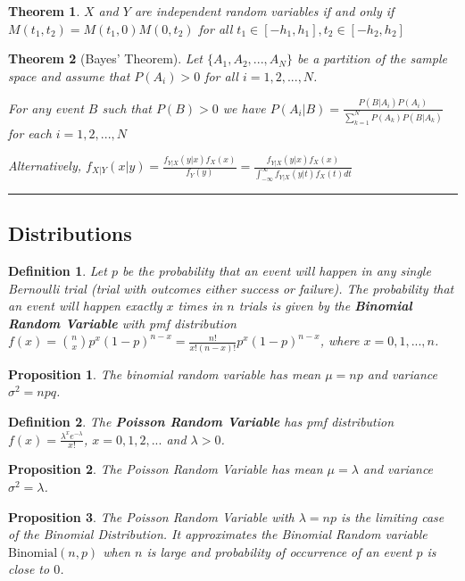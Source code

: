 \documentclass[14pt,twoside]{extreport}
\newcommand{\hhrule}{\vspace{1cm}\hrule\vspace{1cm}}
\theoremstyle{dotless}
\newtheorem*{defn}{Definition}
\newtheorem*{thm}{Theorem} %
\newtheorem*{prop}{Proposition} %
\begin{document}
\begin{thm}
    $X$ and $Y$ are independent random variables if and only if $M(t_1, t_2) = M(t_1, 0) M(0, t_2)$ for all $t_1 \in [-h_1, h_1], t_2 \in [-h_2, h_2]$
\end{thm}

\begin{thm}[Bayes' Theorem]
    Let $\{ A_1, A_2, ..., A_N \}$ be a partition of the sample space and assume that $P(A_i) > 0$ for all $i = 1,2, ..., N$.

    For any event $B$ such that $P(B) > 0$ we have $P(A_i | B) = \frac{P(B|A_i)P(A_i)}{\sum_{k=1}^N P(A_k) P(B|A_k)}$ for each $i = 1, 2, ..., N$


    Alternatively, $f_{X|Y}(x|y) = \frac{f_{Y|X}(y|x) f_X(x)}{f_Y(y)} = \frac{f_{Y|X} (y|x) f_X(x)}{\int_{-\infty}^{\infty} f_{Y|X} (y|t) f_X(t) dt }$
\end{thm}


\hhrule
\subsection*{Distributions}

\begin{defn}
    Let $p$ be the probability that an event will happen in any single Bernoulli trial (trial with outcomes either success or failure). The probability that an event will happen exactly $x$ times in $n$ trials is given by the \textbf{Binomial Random Variable} with pmf distribution $f(x) = {n \choose x} p^x (1-p)^{n-x} = \displaystyle \frac{n!}{x! (n-x)!} p^x (1-p)^{n-x}$, where $x = 0, 1, ... , n$.
\end{defn}

\begin{prop}
The binomial random variable has mean $\mu = np$ and variance $\sigma^2 = npq$.
\end{prop}

\begin{defn}
    The \textbf{Poisson Random Variable} has pmf distribution $f(x) = \displaystyle \frac{\lambda^x e^{-\lambda}}{x!}$, $x = 0, 1, 2, ...$ and $\lambda > 0$.
\end{defn}

\begin{prop}
The Poisson Random Variable has mean $\mu = \lambda$ and variance $\sigma^2 = \lambda$.
\end{prop}
\begin{prop}
    The Poisson Random Variable with $\lambda = np$ is the limiting case of the Binomial Distribution. It approximates the Binomial Random variable $\text{Binomial}(n,p)$ when $n$ is large and probability of occurrence of an event $p$ is close to $0$.
\end{prop}
\end{document}
